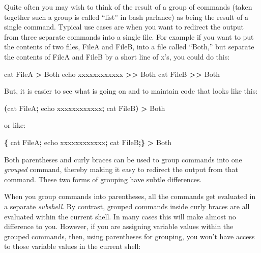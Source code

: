 \documentclass[]{krantz}
\makeatletter
\newenvironment{Shaded}{\begin{snugshade}}{\end{snugshade}}
\newcommand{\BuiltInTok}[1]{#1}
\newcommand{\ExtensionTok}[1]{#1}
\newcommand{\FunctionTok}[1]{\textcolor[rgb]{0,0,0}{#1}}
\newcommand{\KeywordTok}[1]{\textcolor[rgb]{0.27,0.27,0.27}{\textbf{#1}}}
\newcommand{\NormalTok}[1]{#1}
\newcommand{\OperatorTok}[1]{\textcolor[rgb]{0.43,0.43,0.43}{\textbf{#1}}}
\newenvironment{kframe}{%
\medskip{}
\setlength{\fboxsep}{.8em}
 \def\at@end@of@kframe{}%
 \ifinner\ifhmode%
  \def\at@end@of@kframe{\end{minipage}}%
  \begin{minipage}{\columnwidth}%
 \fi\fi%
 \def\FrameCommand##1{\hskip\@totalleftmargin \hskip-\fboxsep
 \colorbox{shadecolor}{##1}\hskip-\fboxsep
     \hskip-\linewidth \hskip-\@totalleftmargin \hskip\columnwidth}%
 \MakeFramed {\advance\hsize-\width
   \@totalleftmargin\z@ \linewidth\hsize
   \@setminipage}}%
 {\par\unskip\endMakeFramed%
 \at@end@of@kframe}
\renewenvironment{Shaded}{\begin{kframe}}{\end{kframe}}
\makeatother
\begin{document}
Quite often you may wish to think of the result of a group of commands (taken together such
a group is called ``list'' in bash parlance) as being the result of a single command. Typical
use cases are when you want to redirect the output from three separate commands into a
single file. For example if you want to put the contents of two files, FileA and FileB,
into a file called ``Both,'' but separate the contents of FileA and FileB by a short line of
x's, you could do this:

\begin{Shaded}
\begin{Highlighting}[]
\FunctionTok{cat}\NormalTok{ FileA }\OperatorTok{>}\NormalTok{ Both}
\BuiltInTok{echo}\NormalTok{ xxxxxxxxxxxx }\OperatorTok{>>}\NormalTok{ Both}
\FunctionTok{cat}\NormalTok{ FileB }\OperatorTok{>>}\NormalTok{ Both}
\end{Highlighting}
\end{Shaded}

But, it is easier to see what is going on and to maintain code that looks like this:

\begin{Shaded}
\begin{Highlighting}[]
\KeywordTok{(}\FunctionTok{cat}\NormalTok{ FileA}\KeywordTok{;} \BuiltInTok{echo}\NormalTok{ xxxxxxxxxxxx}\KeywordTok{;} \FunctionTok{cat}\NormalTok{ FileB}\KeywordTok{)} \OperatorTok{>} \ExtensionTok{Both}
\end{Highlighting}
\end{Shaded}

or like:

\begin{Shaded}
\begin{Highlighting}[]
\KeywordTok{\{} \FunctionTok{cat}\NormalTok{ FileA}\KeywordTok{;} \BuiltInTok{echo}\NormalTok{ xxxxxxxxxxxx}\KeywordTok{;} \FunctionTok{cat}\NormalTok{ FileB}\KeywordTok{;\}} \OperatorTok{>} \ExtensionTok{Both}
\end{Highlighting}
\end{Shaded}

Both parentheses and curly braces can be used to group commands into one
\emph{grouped} command, thereby making it easy to redirect the output from
that command. These two forms of grouping have subtle differences.

When you group commands into parentheses, all the commands get
evaluated in a separate \emph{subshell}. By contrast, grouped commands
inside curly braces are all evaluated within the current shell. In
many cases this will make almost no difference to you. However, if you
are assigning variable values within the grouped commands, then, using
parentheses for grouping, you won't have access to those variable values
in the current shell:
\end{document}

